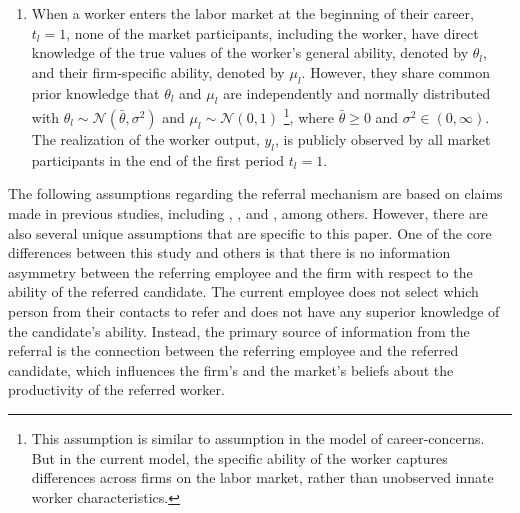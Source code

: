 \documentclass[12pt]{article}
\begin{document}
\begin{enumerate}[label={A}{\arabic*}.]
    \item When a worker enters the labor market at the beginning of their career, $t_l =1$, none of the market participants, including the worker, have direct knowledge of the true values of the worker's general ability, denoted by $\theta_l$, and their firm-specific ability, denoted by $\mu_l$. However, they share common prior knowledge that $\theta_l$ and $\mu_l$ are independently and normally distributed with $\theta_l \sim \mathcal{N}\left( \bar{\theta}, \sigma^2\right)$ and $\mu_l \sim \mathcal{N}\left( 0, 1\right)$ \footnote{This assumption is similar to \cite{ekinci2016employee} assumption in the model of career-concerns. But in the current model, the specific ability of the worker captures differences across firms on the labor market, rather than unobserved innate worker characteristics.}, where $\bar{\theta} \geq 0$ and $\sigma^2 \in (0, \infty)$. The realization of the worker output, $y_l$, is publicly observed by all market participants in the end of the first period $t_l = 1$. %
\end{enumerate}

The following assumptions regarding the referral mechanism are based on claims made in previous studies, including \cite{friebel2023employee}, \cite{ekinci2016employee}, and \cite{lester2021heterogeneous}, among others. However, there are also several unique assumptions that are specific to this paper. One of the core differences between this study and others is that there is no information asymmetry between the referring employee and the firm with respect to the ability of the referred candidate. The current employee does not select which person from their contacts to refer and does not have any superior knowledge of the candidate's ability. Instead, the primary source of information from the referral is the connection between the referring employee and the referred candidate, which influences the firm's and the market's beliefs about the productivity of the referred worker.
\end{document}
